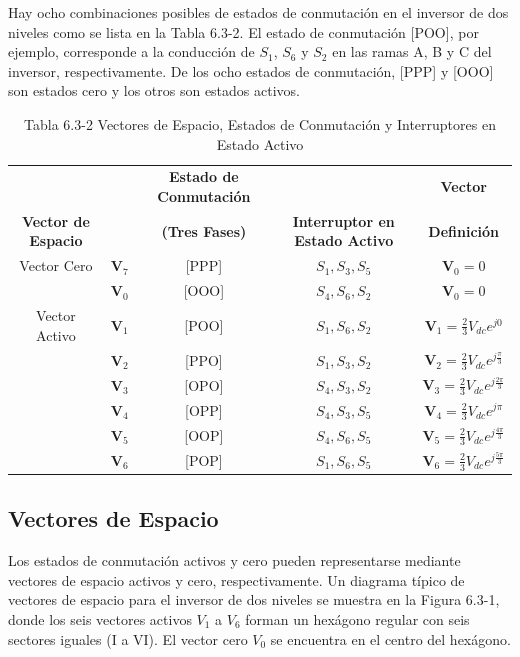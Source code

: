 \documentclass[letterpaper,12pt]{article}
\begin{document}
Hay ocho combinaciones posibles de estados de conmutación en el inversor de dos niveles como se lista en la Tabla 6.3-2. El estado de conmutación [POO], por ejemplo, corresponde a la conducción de $S_1$, $S_6$ y $S_2$ en las ramas A, B y C del inversor, respectivamente. De los ocho estados de conmutación, [PPP] y [OOO] son estados cero y los otros son estados activos.

\begin{table}[h]
    \centering
    \caption{Tabla 6.3-2 Vectores de Espacio, Estados de Conmutación y Interruptores en Estado Activo}
    \begin{tabular}{c c c c c}
    \hline
    & & \textbf{Estado de Conmutación} & & \textbf{Vector} \\
        \textbf{Vector de Espacio}  & & \textbf{(Tres Fases)} & \textbf{Interruptor en Estado Activo} & \textbf{Definición} \\
    \hline
    Vector Cero & $\mathbf{V}_7$ & [PPP] & $S_1, S_3, S_5$ & $\mathbf{V}_0 = 0$ \\
                & $\mathbf{V}_0$ & [OOO] & $S_4, S_6, S_2$ & $\mathbf{V}_0 = 0$ \\ [1em]
    Vector Activo & $\mathbf{V}_1$ & [POO] & $S_1, S_6, S_2$ & $\mathbf{V}_1 = \frac{2}{3} V_{dc}e^{j0}$ \\[0.5em]
    & $\mathbf{V}_2$ & [PPO] & $S_1, S_3, S_2$ & $\mathbf{V}_2 = \frac{2}{3} V_{dc}e^{j\frac{\pi}{3}}$ \\[0.5em]
    & $\mathbf{V}_3$ & [OPO] & $S_4, S_3, S_2$ & $\mathbf{V}_3 = \frac{2}{3} V_{dc}e^{j\frac{2\pi}{3}}$ \\[0.5em]
    & $\mathbf{V}_4$ & [OPP] & $S_4, S_3, S_5$ & $\mathbf{V}_4 = \frac{2}{3} V_{dc}e^{j\pi}$ \\[0.5em]
    & $\mathbf{V}_5$ & [OOP] & $S_4, S_6, S_5$ & $\mathbf{V}_5 = \frac{2}{3} V_{dc}e^{j\frac{4\pi}{3}}$ \\[0.5em]
    & $\mathbf{V}_6$ & [POP] & $S_1, S_6, S_5$ & $\mathbf{V}_6 = \frac{2}{3} V_{dc}e^{j\frac{5\pi}{3}}$ \\[0.5em]
    \hline
    \end{tabular}
    \label{tabla:vectores_espacio}
\end{table}
\FloatBarrier
    
\subsection{Vectores de Espacio}
Los estados de conmutación activos y cero pueden representarse mediante vectores de espacio activos y cero, respectivamente. Un diagrama típico de vectores de espacio para el inversor de dos niveles se muestra en la Figura 6.3-1, donde los seis vectores activos $V_1$ a $V_6$ forman un hexágono regular con seis sectores iguales (I a VI). El vector cero $V_0$ se encuentra en el centro del hexágono.
\end{document}

